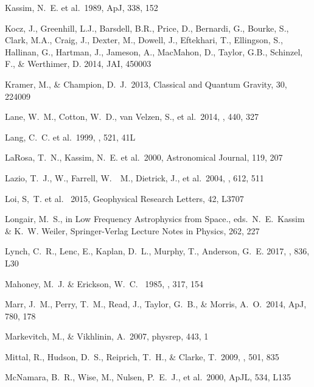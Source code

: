 \documentclass[11pt]{article}
\begin{document}
\begin{thebibliography}{}
 Kassim, N.~E. et al.\ 1989, ApJ, 338, 152 

Kocz, J., Greenhill, L.J., Barsdell, B.R., Price, D., Bernardi, G., Bourke, S., Clark, M.A., Craig, J., Dexter, M., Dowell, J., Eftekhari, T., Ellingson, S., Hallinan, G., Hartman, J., Jameson, A., MacMahon, D., Taylor, G.B., Schinzel, F., \& Werthimer, D. 2014, JAI, 450003 

 Kramer, M., \& Champion, D.~J.\ 2013, Classical and Quantum Gravity, 30, 224009 

 Lane, W.~M., Cotton, W.~D., van Velzen, S., et al.\ 2014, \mnras, 440, 327

 Lang, C.~C. et al.\ 1999, \apj, 521, 41L

 LaRosa, T.~N., Kassim, N.~E. et al.\ 2000, Astronomical Journal, 119, 207 

 Lazio, T.~J., W., Farrell, W.\
~M., Dietrick, J., et al.\ 2004, \apj, 612, 511

 Loi, S,~T. et al. \ 2015, Geophysical Research Letters, 42, L3707

 Longair, M.~S., in Low Frequency Astrophysics from Space., eds.~N.~E.~Kassim \& K.~W. Weiler, Springer-Verlag Lecture Notes in Physics, 262, 227   

 Lynch, C.~R., Lenc, E., Kaplan, D.~L., Murphy, T., Anderson, G.~E. 2017, \apjl, 836, L30

 Mahoney, M.~J. \& Erickson, W.~C. \ 1985, \nat, 317, 154 


 Marr, J.~M., Perry, T.~M.,
Read, J., Taylor, G.~B., \& Morris, A.~O.\ 2014, ApJ, 780, 178

 Markevitch, M., \& Vikhlinin, A.\ 2007, physrep, 443, 1 


 Mittal, R., Hudson, D.~S., Reiprich, T.~H., \& Clarke, T.\ 2009, \aap, 501, 835

 McNamara, B.~R., Wise,
M., Nulsen, P.~E.~J., et al.\ 2000, ApJL, 534, L135


\end{thebibliography}
\end{document}
